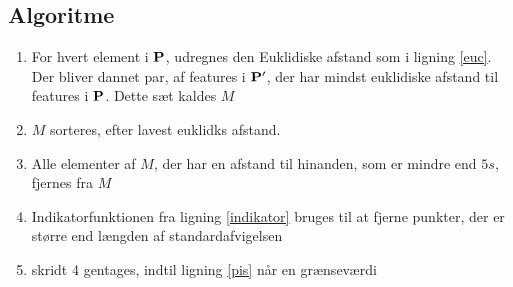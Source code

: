\subsection*{Algoritme}
\begin{enumerate}
\item{For hvert element i $\bold{P}$, udregnes den Euklidiske afstand som i ligning \eqref{euc}. Der bliver dannet par, af features i $\bold{P}'$, der har mindst euklidiske afstand til features i $\bold{P}$. Dette sæt kaldes $M$}
\item{$M$ sorteres, efter lavest euklidks afstand.}
\item{Alle elementer af $M$, der har en afstand til hinanden, som er mindre end $5s$, fjernes fra $M$}
\item{Indikatorfunktionen fra ligning \eqref{indikator} bruges til at fjerne punkter, der er større end længden af standardafvigelsen}
\item{skridt 4 gentages, indtil ligning \eqref{pis} når en grænseværdi}
\end{enumerate}